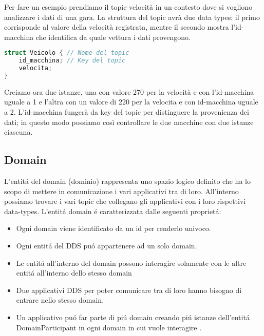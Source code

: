 Per fare un esempio prendiamo il topic velocità in un contesto dove si
vogliono analizzare i dati di una gara.
La struttura del topic avrà due data types: il primo corrisponde al valore
della velocità registrata, mentre il secondo mostra l'id-macchina 
che identifica da quale vettura i dati provengono.

\vspace{5mm} %
\begin{lstlisting}[language=C++, caption=Esempio di Topic con una key
    usando il linguaggio IDL.
    , label=topic struct,
    captionpos=b]
struct Veicolo { // Nome del topic
    id_macchina; // Key del topic
    velocita;
}
\end{lstlisting}
\vspace{5mm}

Creiamo ora due istanze, una con valore 270 per la velocità e con 
l'id-macchina uguale a 1 e l'altra con un valore di 220 per la velocita e 
con id-macchina 
uguale a 2. L'id-macchina fungerà da key 
del topic per distinguere la provenienza dei dati; in questo
modo possiamo così controllare le due macchine con due istanze ciascuna.



\subsection{Domain}
L'entitá del domain (dominio) rappresenta uno spazio logico definito che
ha lo scopo di mettere in comunicazione i vari applicativi tra di loro.
All'interno possiamo trovare i vari topic che collegano gli applicativi
con i loro rispettivi data-types.
L'entitá domain é caratterizzata dalle seguenti proprietá:
\begin{itemize}
    \item Ogni domain viene identificato da un id 
    per renderlo univoco.
    \item Ogni entitá del DDS puó appartenere
    ad un solo domain.
    \item Le entitá all'interno del domain possono interagire
    solamente con le altre entitá all'interno dello stesso domain
    \item Due applicativi DDS per poter comunicare tra di loro
    hanno bisogno di entrare nello stesso domain.
    \item Un applicativo puó far parte di piú domain creando 
    piú istanze dell'entitá DomainParticipant in ogni
    domain in cui vuole interagire \cite{domainrti}.
\end{itemize}

